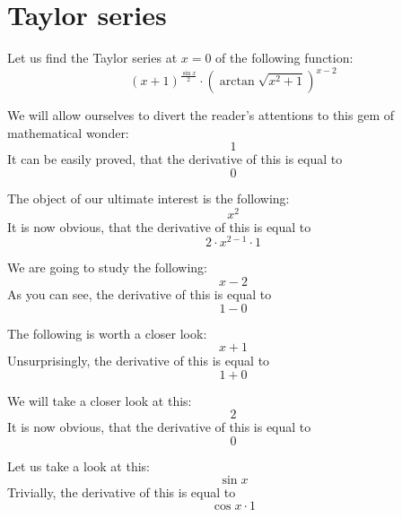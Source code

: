 \documentclass{article}
\begin{document}
\newpage
\section{Taylor series}
Let us find the Taylor series at $x = 0$ of the following function:
\begin{equation}
\left( x + 1 \right) ^{\frac{\sin x }{2 } } \cdot \left( \arctan \sqrt {x ^{2 } + 1 } \right) ^{x - 2 } 
\end{equation}

We will allow ourselves to divert the reader's attentions to this gem of mathematical wonder:
\begin{equation}
1 
\end{equation}
It can be easily proved, that the derivative of this is equal to
\begin{equation}
0 
\end{equation}

The object of our ultimate interest is the following:
\begin{equation}
x ^{2 } 
\end{equation}
It is now obvious, that the derivative of this is equal to
\begin{equation}
2 \cdot x ^{2 - 1 } \cdot 1 
\end{equation}

We are going to study the following:
\begin{equation}
x - 2 
\end{equation}
As you can see, the derivative of this is equal to
\begin{equation}
1 - 0 
\end{equation}

The following is worth a closer look:
\begin{equation}
x + 1 
\end{equation}
Unsurprisingly, the derivative of this is equal to
\begin{equation}
1 + 0 
\end{equation}

We will take a closer look at this:
\begin{equation}
2 
\end{equation}
It is now obvious, that the derivative of this is equal to
\begin{equation}
0 
\end{equation}

Let us take a look at this:
\begin{equation}
\sin x 
\end{equation}
Trivially, the derivative of this is equal to
\begin{equation}
\cos x \cdot 1 
\end{equation}
\end{document}
